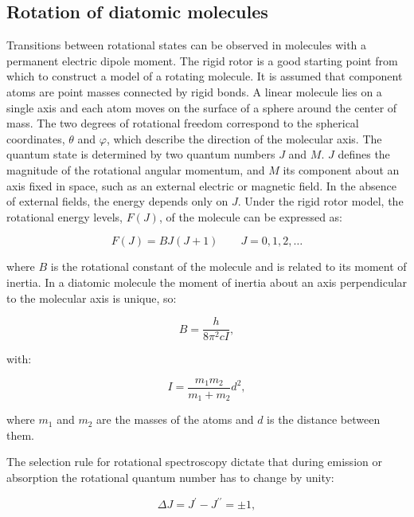 \documentclass[
  9pt,
]{extbook}
\theoremstyle{definition}
\theoremstyle{definition}
\theoremstyle{definition}
\theoremstyle{remark}
\begin{document}
\hypertarget{rotation-of-diatomic-molecules}{%
\subsection{Rotation of diatomic molecules}\label{rotation-of-diatomic-molecules}}

Transitions between rotational states can be observed in molecules with a permanent electric dipole moment. The rigid rotor is a good starting point from which to construct a model of a rotating molecule. It is assumed that component atoms are point masses connected by rigid bonds. A linear molecule lies on a single axis and each atom moves on the surface of a sphere around the center of mass. The two degrees of rotational freedom correspond to the spherical coordinates, \(\theta\) and \(\varphi\), which describe the direction of the molecular axis. The quantum state is determined by two quantum numbers \(J\) and \(M\). \(J\) defines the magnitude of the rotational angular momentum, and \(M\) its component about an axis fixed in space, such as an external electric or magnetic field. In the absence of external fields, the energy depends only on \(J\). Under the rigid rotor model, the rotational energy levels, \(F(J)\), of the molecule can be expressed as:

\begin{equation}
F\left(J\right)=BJ\left(J+1\right)\qquad J=0,1,2,\ldots
\label{eq:rot1}
\end{equation}

where \(B\) is the rotational constant of the molecule and is related to its moment of inertia. In a diatomic molecule the moment of inertia about an axis perpendicular to the molecular axis is unique, so:

\begin{equation}
B={\frac{h}{8\pi ^{2}cI}},
\label{eq:rot2}
\end{equation}

with:

\begin{equation}
 I=\frac{m_1m_2}{m_1 +m_2}d^2,
 \label{eq:rot3}
\end{equation}

where \(m_1\) and \(m_2\) are the masses of the atoms and \(d\) is the distance between them.

The selection rule for rotational spectroscopy dictate that during emission or absorption the rotational quantum number has to change by unity:

\begin{equation}
 \Delta J = J^{{\prime }} - J^{{\prime \prime }} = \pm 1,
 \label{eq:rot4}
\end{equation}
\end{document}
